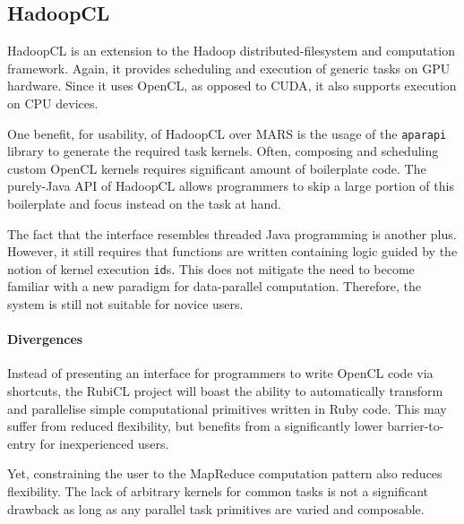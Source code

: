 \subsection{HadoopCL}
HadoopCL\cite{hadoopcl} is an extension to the Hadoop\cite{hadoop} distributed-filesystem and computation framework. Again, it provides scheduling and execution of generic tasks on  \ac{GPU} hardware. Since it uses \ac{OpenCL}, as opposed to \ac{CUDA}, it also supports execution on \ac{CPU} devices.

One benefit, for usability, of HadoopCL over MARS is the usage of the \verb|aparapi| library\cite{aparapi} to generate the required task kernels. Often, composing and scheduling custom \ac{OpenCL} kernels requires significant amount of boilerplate code. The purely-Java \ac{API} of HadoopCL allows programmers to skip a large portion of this boilerplate and focus instead on the task at hand.

The fact that the interface resembles threaded Java programming is another plus. However, it still requires that functions are written containing logic guided by the notion of kernel execution \verb|id|s. This does not mitigate the need to become familiar with a new paradigm for data-parallel computation. Therefore, the system is still not suitable for novice users.

\paragraph*{Divergences}
Instead of presenting an interface for programmers to write \ac{OpenCL} code via shortcuts, the RubiCL project will boast the ability to automatically transform and parallelise simple computational primitives written in Ruby code. This may suffer from reduced flexibility, but benefits from a significantly lower barrier-to-entry for inexperienced users.

Yet, constraining the user to the MapReduce computation pattern also reduces flexibility. The lack of arbitrary kernels for common tasks is not a significant drawback as long as any parallel task primitives are varied and composable.


